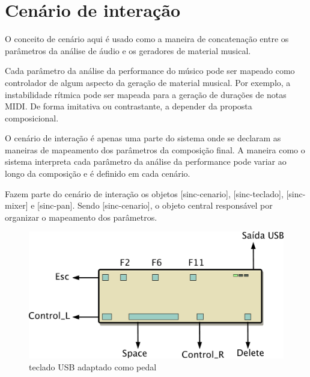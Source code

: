 \documentclass{ppgmus}
\begin{document}





\section{Cenário de interação}


O conceito de cenário aqui é usado como a maneira de concatenação
entre os parâmetros da análise de áudio e os geradores de material
musical.


Cada parâmetro da análise da performance do músico pode ser mapeado como controlador
de algum aspecto da geração de material musical. Por exemplo,
a instabilidade rítmica pode ser mapeada para a geração de durações
de notas MIDI. De forma imitativa ou contrastante, a depender da
proposta composicional.

O cenário de interação é apenas uma parte do sistema onde se declaram
as maneiras de mapeamento dos parâmetros da composição final. A maneira
como o sistema interpreta cada parâmetro da análise da performance pode
variar ao longo da composição e é definido em cada cenário.


Fazem parte do cenário de interação os objetos [sinc-cenario], [sinc-teclado],
[sinc-mixer] e [sinc-pan]. Sendo [sinc-cenario], o objeto central responsável
por organizar o mapeamento dos parâmetros.

\begin{figure}[-h]
\includegraphics[scale=.4]{teclado}
\caption{teclado USB adaptado como pedal}
\label{teclado}
\end{figure}
\end{document}
